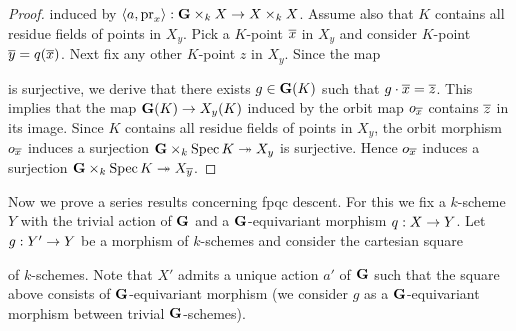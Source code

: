 \begin{proof}
induced by $\langle a, \mathrm{pr}_x\rangle:\mathbf{G}\times_kX \rightarrow X\times_kX$. Assume also that $K$ contains all residue fields of points in $X_y$. Pick a $K$-point $\overline{x}$ in $X_y$ and consider $K$-point $\overline{y} = q(\overline{x})$. Next fix any other $K$-point $z$ in $X_{y}$. Since the map
\begin{center}
\end{center}
is surjective, we derive that there exists $g\in \mathbf{G}(K)$ such that $g\cdot \overline{x} = \overline{z}$. This implies that the map $\mathbf{G}(K) \rightarrow X_{y}(K)$ induced by the orbit map $o_{\overline{x}}$ contains $\overline{z}$ in its image. Since $K$ contains all residue fields of points in $X_y$, the orbit morphism $o_{\overline{x}}$ induces a surjection $\mathbf{G}\times_k\mathrm{Spec}\, K\twoheadrightarrow X_y$ is surjective. Hence $o_{\overline{x}}$ induces a surjection $\mathbf{G}\times_k\mathrm{Spec}\, K\twoheadrightarrow X_{\overline{y}}$.
\end{proof}
\noindent
Now we prove a series results concerning fpqc descent. For this we fix a $k$-scheme $Y$ with the trivial action of $\mathbf{G}$ and a $\mathbf{G}$-equivariant morphism $q:X\rightarrow Y$. Let $g:Y'\rightarrow Y$ be a morphism of $k$-schemes and consider the cartesian square
\begin{center}
\end{center}
of $k$-schemes. Note that $X'$ admits a unique action $a'$ of $\mathbf{G}$ such that the square above consists of $\mathbf{G}$-equivariant morphism (we consider $g$ as a $\mathbf{G}$-equivariant morphism between trivial $\mathbf{G}$-schemes).

